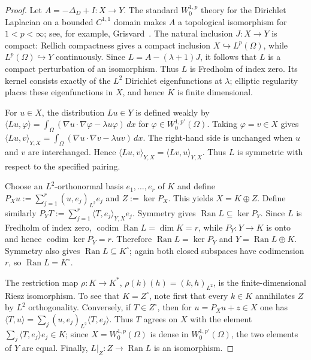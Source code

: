 \documentclass[11pt]{article}
\theoremstyle{definition}
\theoremstyle{remark}
\begin{document}
\begin{proof} Let $A=-\Delta_D+I:X\to Y$. The standard $W^{1,p}_0$ theory for the Dirichlet Laplacian on a bounded $C^{1,1}$ domain makes $A$ a topological isomorphism for $1<p<\infty$; see, for example, Grisvard~\cite{Grisvard1985}. The natural inclusion $J:X\to Y$ is compact: Rellich compactness gives a compact inclusion $X\hookrightarrow L^p(\Omega)$, while $L^p(\Omega)\hookrightarrow Y$ continuously. Since
$L=A-(\lambda+1)J$, it follows that $L$ is a compact perturbation of an isomorphism. Thus $L$ is Fredholm of index zero. Its kernel consists exactly of the $L^2$ Dirichlet eigenfunctions at $\lambda$; elliptic regularity places these eigenfunctions in $X$, and hence $K$ is finite dimensional.

\smallskip
For $u\in X$, the distribution $Lu\in Y$ is defined weakly by $\langle Lu,\varphi\rangle=\int_\Omega(\nabla u\cdot\nabla\varphi-\lambda u\varphi)\,dx$ for $\varphi\in W^{1,p'}_0(\Omega)$. Taking $\varphi=v\in X$ gives $\langle Lu,v\rangle_{Y,X}=\int_\Omega(\nabla u\cdot\nabla v-\lambda uv)\,dx$.
The right-hand side is unchanged when $u$ and $v$ are interchanged. Hence $\langle Lu,v\rangle_{Y,X}=\langle Lv,u\rangle_{Y,X}$.
Thus $L$ is symmetric with respect to the specified pairing. 

\smallskip
Choose an $L^2$-orthonormal basis $e_1,\dots,e_r$ of $K$ and define $P_Xu:=\sum_{j=1}^r(u,e_j)_{L^2}e_j$ and $Z:=\ker P_X$. This yields $X=K\oplus Z$. Define similarly $P_YT:=\sum_{j=1}^r\langle T,e_j\rangle_{Y,X}e_j$.
Symmetry gives $\operatorname{Ran}L\subseteq\ker P_Y$. Since $L$ is Fredholm of index zero, $\operatorname{codim}\operatorname{Ran}L=\dim K=r$, while $P_Y:Y\to K$ is onto and hence $\operatorname{codim}\ker P_Y=r$. Therefore $\operatorname{Ran}L=\ker P_Y$ and $Y=\operatorname{Ran}L\oplus K$. Symmetry also gives $\operatorname{Ran}L\subseteq K^\circ$; again both closed subspaces have codimension $r$, so $\operatorname{Ran}L=K^\circ$.

The restriction map $\rho:K\to K^*$, $\rho(k)(h)=(k,h)_{L^2}$, is the finite-dimensional Riesz isomorphism. To see that $K=Z^\circ$, note first that every $k\in K$ annihilates $Z$ by $L^2$ orthogonality. Conversely, if $T\in Z^\circ$, then for $u=P_Xu+z\in X$ one has $\langle T,u\rangle=\sum_j(u,e_j)_{L^2}\langle T,e_j\rangle$. Thus $T$ agrees on $X$ with the element $\sum_j\langle T,e_j\rangle e_j\in K$; since $X=W^{1,p}_0(\Omega)$ is dense in $W^{1,p'}_0(\Omega)$, the two elements of $Y$ are equal. Finally, $L|_Z:Z\to\operatorname{Ran}L$ is an isomorphism.
\end{proof}
\end{document}
